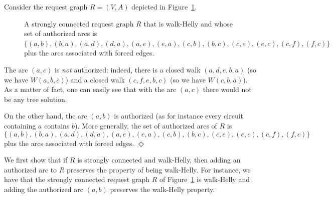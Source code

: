 \documentclass[11pt]{article}%
\begin{document}
\begin{example}\label{ex:algo}
 Consider the request graph $R=(V,A)$ depicted in Figure~\ref{fig:authorized-arcs}. 
 
    \begin{figure}[!ht]
      \centering
\caption{A strongly connected request graph $R$ that is walk-Helly and whose set of authorized arcs is $\{(a,b),(b,a),(a,d),(d,a),(a,e),(e,a),(c,b),(b,c),(c,e),(e,c),(c,f),(f,c)\}$ plus the arcs associated with forced edges.}
\label{fig:authorized-arcs}
    \end{figure} 
     
 
 The arc $(a,c)$ is {\it not} authorized: indeed, there is a closed walk $(a,d,e,b,a)$ (so we have $W(a,b,\overline{c})$) and a closed walk $(c,f,e,b,c)$ (so we have $W(c,b,\overline{a})$). As a matter of fact, one can easily see that with the arc $(a,c)$ there would not be any tree solution.   
 
 On the other hand, the arc $(a,b)$ is authorized (as for instance every circuit containing $a$ contains $b$). More generally, the set of authorized arcs of $R$ is $$\{(a,b),(b,a),(a,d),(d,a),(a,e),(e,a),(c,b),(b,c),(c,e),(e,c),(c,f),(f,c)\}$$ \noindent plus the arcs associated with forced edges.\hfill{} $\Diamond$ 
\end{example}
We first show that if $R$ is strongly connected and walk-Helly, then adding an authorized arc to $R$ preserves the property of being walk-Helly. For instance, we have that the strongly connected request graph $R$ of Figure~\ref{fig:authorized-arcs} is walk-Helly and adding the authorized arc $(a,b)$ preserves the walk-Helly property.
\end{document}
